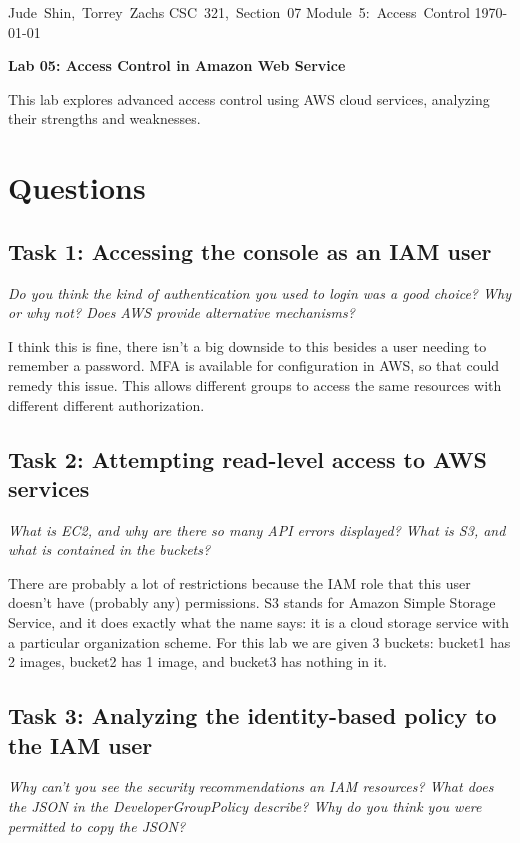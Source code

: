 \documentclass[11pt]{article}
\begin{document}
\hfill\vbox{\hbox{Jude Shin, Torrey Zachs}
		\hbox{CSC 321, Section 07}	
		\hbox{Module 5: Access Control}	
		\hbox{\today}}\par

\bigskip
\centerline{\Large\bf Lab 05: Access Control in Amazon Web Service}\par
\bigskip

This lab explores advanced access control using AWS cloud services, analyzing their strengths and weaknesses. 


\section*{Questions}
\subsection*{Task 1: Accessing the console as an IAM user}
\textit{Do you think the kind of authentication you used to login was a good choice? Why or why not? Does AWS provide alternative mechanisms?}

I think this is fine, there isn't a big downside to this besides a user needing to remember a password. MFA is available for configuration in AWS, so that could remedy this issue. This allows different groups to access the same resources with different different authorization.

\subsection*{Task 2: Attempting read-level access to AWS services}
\textit{What is EC2, and why are there so many API errors displayed? What is S3, and what is contained in the buckets?}

There are probably a lot of restrictions because the IAM role that this user doesn't have (probably any) permissions. S3 stands for Amazon Simple Storage Service, and it does exactly what the name says: it is a cloud storage service with a particular organization scheme. For this lab we are given 3 buckets: bucket1 has 2 images, bucket2 has 1 image, and bucket3 has nothing in it. 


\subsection*{Task 3: Analyzing the identity-based policy to the IAM user}
\textit{Why can't you see the security recommendations an IAM resources? What does the JSON in the DeveloperGroupPolicy describe? Why do you think you were permitted to copy the JSON?}
\end{document}
